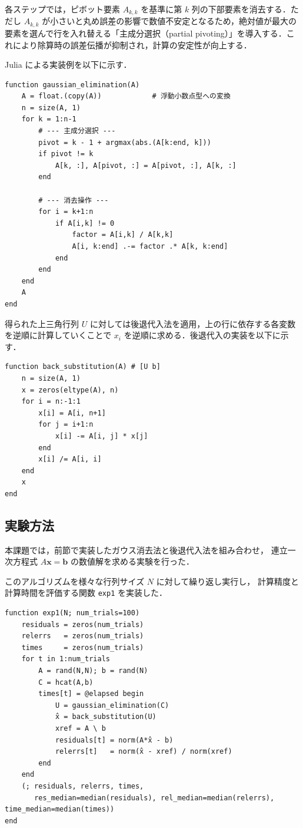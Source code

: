 \documentclass[a4paper,11pt]{ltjsarticle}
\begin{document}
各ステップでは，ピボット要素 $A_{k,k}$ を基準に第 $k$ 列の下部要素を消去する．ただし $A_{k,k}$ が小さいと丸め誤差の影響で数値不安定となるため，絶対値が最大の要素を選んで行を入れ替える「主成分選択（partial pivoting）」を導入する．これにより除算時の誤差伝播が抑制され，計算の安定性が向上する．

Julia による実装例を以下に示す．

\begin{verbatim}
function gaussian_elimination(A)
    A = float.(copy(A))            # 浮動小数点型への変換
    n = size(A, 1)
    for k = 1:n-1
        # --- 主成分選択 ---
        pivot = k - 1 + argmax(abs.(A[k:end, k]))
        if pivot != k
            A[k, :], A[pivot, :] = A[pivot, :], A[k, :]
        end

        # --- 消去操作 ---
        for i = k+1:n
            if A[i,k] != 0
                factor = A[i,k] / A[k,k]
                A[i, k:end] .-= factor .* A[k, k:end]
            end
        end
    end
    A
end
\end{verbatim}

得られた上三角行列 $U$ に対しては後退代入法を適用，上の行に依存する各変数を逆順に計算していくことで $x_{i}$ を逆順に求める．後退代入の実装を以下に示す．

\begin{verbatim}
function back_substitution(A) # [U b]
    n = size(A, 1)
    x = zeros(eltype(A), n)
    for i = n:-1:1
        x[i] = A[i, n+1]
        for j = i+1:n
            x[i] -= A[i, j] * x[j]
        end
        x[i] /= A[i, i]
    end
    x
end
\end{verbatim}



\subsection{実験方法}
本課題では，前節で実装したガウス消去法と後退代入法を組み合わせ，
連立一次方程式 $A\boldsymbol{x}=\boldsymbol{b}$ の数値解を求める実験を行った．

このアルゴリズムを様々な行列サイズ $N$ に対して繰り返し実行し，
計算精度と計算時間を評価する関数 \verb|exp1| を実装した．

\begin{verbatim}
function exp1(N; num_trials=100)
    residuals = zeros(num_trials)
    relerrs   = zeros(num_trials)
    times     = zeros(num_trials)
    for t in 1:num_trials
        A = rand(N,N); b = rand(N)
        C = hcat(A,b)
        times[t] = @elapsed begin
            U = gaussian_elimination(C)
            x̂ = back_substitution(U)
            xref = A \ b
            residuals[t] = norm(A*x̂ - b)
            relerrs[t]   = norm(x̂ - xref) / norm(xref)
        end
    end
    (; residuals, relerrs, times,
       res_median=median(residuals), rel_median=median(relerrs), time_median=median(times))
end
\end{verbatim}
\end{document}
